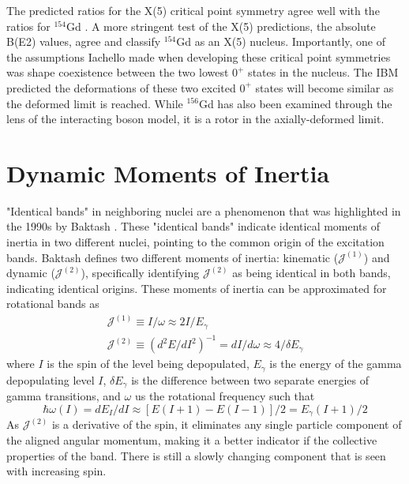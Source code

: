 The predicted ratios for the X(5) critical point symmetry agree well with the ratios for $^{154}$Gd \citep{tonev04:_154gd}. A more stringent test of the X(5) predictions, the absolute B(E2) values, agree and classify $^{154}$Gd as an X(5) nucleus. Importantly, one of the assumptions Iachello made when developing these critical point symmetries was shape coexistence between the two lowest $0^+$ states in the nucleus. The IBM predicted the deformations of these two excited $0^+$ states will become similar as the deformed limit is reached\citep{werner08:_x5}. While $^{156}$Gd has also been examined through the lens of the interacting boson model, it is a rotor in the axially-deformed limit.



\section{Dynamic Moments of Inertia}
\label{sec:Dynamic}

"Identical bands" in neighboring nuclei are a phenomenon that was highlighted in the 1990s by Baktash \citep{baktash95:_dynamic_inertia}. These "identical bands" indicate identical moments of inertia in two different nuclei, pointing to the common origin of the excitation bands. Baktash\citep{baktash95:_dynamic_inertia} defines two different moments of inertia: kinematic ($\mathscr{J}^{(1)}$) and dynamic ($\mathscr{J}^{(2)}$), specifically identifying $\mathscr{J}^{(2)}$ as being identical in both bands, indicating identical origins. These moments of inertia can be approximated for rotational bands as 
\begin{equation}
    \begin{split}
        \mathscr{J}^{(1)}\equiv I/\omega \approx 2I/E_{\gamma} \\
        \mathscr{J}^{(2)}\equiv (d^2E/dI^2)^{-1} = dI/d\omega \approx 4/\delta E_{\gamma}
    \end{split}
\end{equation}
where $I$ is the spin of the level being depopulated, $E_{\gamma}$ is the energy of the gamma depopulating level $I$, $\delta E_{\gamma}$ is the difference between two separate energies of gamma transitions, and $\omega$ us the rotational frequency such that 
\begin{equation}
    \hbar \omega(I) =dE_{I}/dI \approx \left[E(I+1)-E(I-1)\right]/2 = E_{\gamma}(I+1)/2
\end{equation}
As $\mathscr{J}^{(2)}$ is a derivative of the spin, it eliminates any single particle component of the aligned angular momentum, making it a better indicator if the collective properties of the band. There is still a slowly changing component that is seen with increasing spin.


